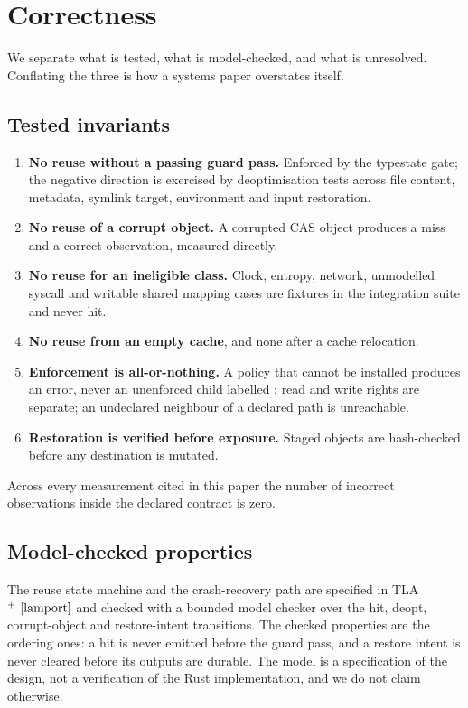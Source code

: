 \section{Correctness}
\label{sec:correctness}

We separate what is tested, what is model-checked, and what is unresolved. Conflating the three is
how a systems paper overstates itself.

\subsection{Tested invariants}

\begin{enumerate}
  \item \textbf{No reuse without a passing guard pass.} Enforced by the typestate gate; the
  negative direction is exercised by deoptimisation tests across file content, metadata, symlink
  target, environment and input restoration.
  \item \textbf{No reuse of a corrupt object.} A corrupted CAS object produces a miss and a correct
  observation, measured directly.
  \item \textbf{No reuse for an ineligible class.} Clock, entropy, network, unmodelled syscall and
  writable shared mapping cases are fixtures in the integration suite and never hit.
  \item \textbf{No reuse from an empty cache}, and none after a cache relocation.
  \item \textbf{Enforcement is all-or-nothing.} A policy that cannot be installed produces an
  error, never an unenforced child labelled \proven{}; read and write rights are separate; an
  undeclared neighbour of a declared path is unreachable.
  \item \textbf{Restoration is verified before exposure.} Staged objects are hash-checked before
  any destination is mutated.
\end{enumerate}

Across every measurement cited in this paper the number of incorrect observations inside the
declared contract is zero.

\subsection{Model-checked properties}

The reuse state machine and the crash-recovery path are specified in TLA$^+\ \cite{lamport}$ and
checked with a bounded model checker over the hit, deopt, corrupt-object and restore-intent
transitions. The checked properties are the ordering ones: a hit is never emitted before the guard
pass, and a restore intent is never cleared before its outputs are durable. The model is a
specification of the design, not a verification of the Rust implementation, and we do not claim
otherwise.

